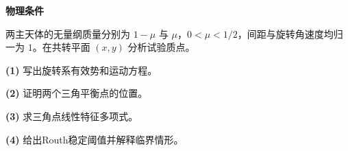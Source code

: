 \textbf{物理条件}\par 两主天体的无量纲质量分别为 \(1-\mu\) 与 \(\mu\)，\(0<\mu<1/2\)，间距与旋转角速度均归一为 \(1\)。在共转平面 \((x,y)\) 分析试验质点。
\par\noindent\textbf{(1)} 写出旋转系有效势和运动方程。
\par\noindent\textbf{(2)} 证明两个三角平衡点的位置。
\par\noindent\textbf{(3)} 求三角点线性特征多项式。
\par\noindent\textbf{(4)} 给出Routh稳定阈值并解释临界情形。
